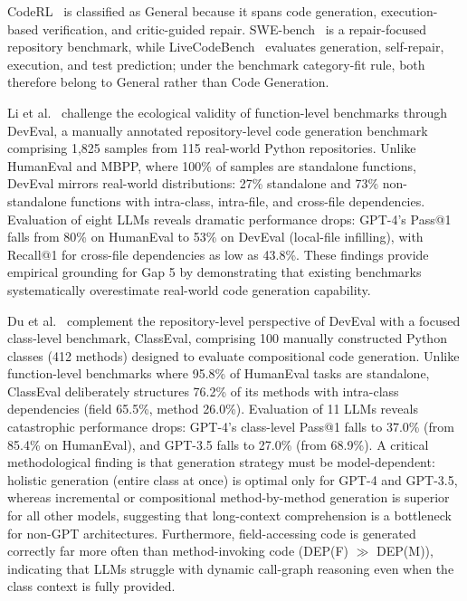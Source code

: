 \documentclass[10pt,a4paper]{article}
\begin{document}
CodeRL~\cite{le2022coderl} is classified as General because it spans code generation, execution-based verification, and critic-guided repair. SWE-bench~\cite{jimenez2024swebench} is a repair-focused repository benchmark, while LiveCodeBench~\cite{jain2024} evaluates generation, self-repair, execution, and test prediction; under the benchmark category-fit rule, both therefore belong to General rather than Code Generation.

Li et al.~\cite{li2024deveval} challenge the ecological validity of function-level benchmarks through DevEval, a manually annotated repository-level code generation benchmark comprising 1,825 samples from 115 real-world Python repositories. Unlike HumanEval and MBPP, where 100\% of samples are standalone functions, DevEval mirrors real-world distributions: 27\% standalone and 73\% non-standalone functions with intra-class, intra-file, and cross-file dependencies. Evaluation of eight LLMs reveals dramatic performance drops: GPT-4's Pass@1 falls from 80\% on HumanEval to 53\% on DevEval (local-file infilling), with Recall@1 for cross-file dependencies as low as 43.8\%. These findings provide empirical grounding for Gap 5 by demonstrating that existing benchmarks systematically overestimate real-world code generation capability.

Du et al.~\cite{du2023classeval} complement the repository-level perspective of DevEval with a focused class-level benchmark, ClassEval, comprising 100 manually constructed Python classes (412 methods) designed to evaluate compositional code generation. Unlike function-level benchmarks where 95.8\% of HumanEval tasks are standalone, ClassEval deliberately structures 76.2\% of its methods with intra-class dependencies (field 65.5\%, method 26.0\%). Evaluation of 11 LLMs reveals catastrophic performance drops: GPT-4's class-level Pass@1 falls to 37.0\% (from 85.4\% on HumanEval), and GPT-3.5 falls to 27.0\% (from 68.9\%). A critical methodological finding is that generation strategy must be model-dependent: holistic generation (entire class at once) is optimal only for GPT-4 and GPT-3.5, whereas incremental or compositional method-by-method generation is superior for all other models, suggesting that long-context comprehension is a bottleneck for non-GPT architectures. Furthermore, field-accessing code is generated correctly far more often than method-invoking code (DEP(F) $\gg$ DEP(M)), indicating that LLMs struggle with dynamic call-graph reasoning even when the class context is fully provided.
\end{document}
